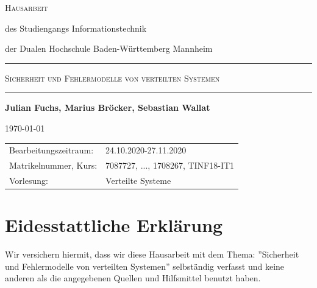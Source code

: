 \documentclass[12pt,a4paper,parskip=half]{scrreprt}
\begin{document}
\begin{titlepage}
{	}
	
	
	
	\bigskip
	
	
	
	\Large\textsc{Hausarbeit}
	
	
	
	\normalsize
	
	des Studiengangs Informationstechnik\par
	
	der Dualen Hochschule Baden-Württemberg Mannheim
	
	
	
	\rule{\textwidth}{.5mm}\bigskip
	
	
	
	\textsc{\large Sicherheit und Fehlermodelle von verteilten Systemen}	
	
	
	\rule{\textwidth}{.5mm}
	
	
	
	\vfill
	
	
	
	\par
	
	{\bfseries\large Julian Fuchs, Marius Bröcker, Sebastian Wallat}\par
	
	\today
	
	
	
	\vfill
	
	
	
	\small{%
		
		\begin{tabularx}{\textwidth}{@{}lX@{}}
			
			\toprule
			
			
			Bearbeitungszeitraum: & 24.10.2020-27.11.2020\\
			
			Matrikelnummer, Kurs: & 7087727, ..., 1708267, TINF18-IT1\\
			
			Vorlesung: & Verteilte Systeme \\
			
		\end{tabularx}
		
	}
	
	\cleardoublepage
	
\end{titlepage}


\newpage
{}

\chapter*{Eidesstattliche Erklärung}
\vspace{50pt}
Wir versichern hiermit, dass wir diese Hausarbeit mit dem Thema: ''Sicherheit und Fehlermodelle von verteilten Systemen'' selbständig verfasst und keine anderen als die angegebenen Quellen und Hilfsmittel benutzt haben.
\\
\\
\end{document}

